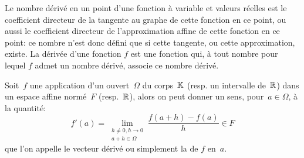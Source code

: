 Le nombre dérivé en un point d'une fonction à variable et valeurs réelles est le coefficient directeur de la tangente au graphe de cette fonction en ce point, ou aussi le coefficient directeur de l'approximation affine de cette fonction en ce point: ce nombre n'est donc défini que si cette tangente, ou cette approximation, existe.
La dérivée d'une fonction $f$ est une fonction qui, à tout nombre pour lequel $f$ admet un nombre dérivé, associe ce nombre dérivé.
\begin{definition}
Soit~$f$ une application d'un ouvert~$\Omega$ du corps~$\mathbb K$ (resp. un intervalle de~$\mathbb R$) dans un espace affine normé~$F$ (resp.~$\mathbb R$), alors on peut donner un sens, pour~$a\in\Omega$, à la quantité:
\begin{equation}\label{Eq-derivee}
f'(a)=\lim_{\substack{h\ne0,h\to0\\a+h\in\Omega}} \dfrac{f(a+h)-f(a)}h \in F
\end{equation}
que l'on appelle le vecteur dérivé ou simplement la  de $f$ en~$a$.
\end{definition}
\medskipvm
